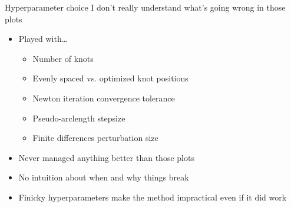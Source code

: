 \documentclass[presentation]{beamer}
\begin{document}
\begin{frame}[<+->][label={sec:orgb1058d1}]{Hyperparameter choice}
I don't really understand what's going wrong in those plots
\vfill
\begin{itemize}
\item Played with\ldots{}
\begin{itemize}
\item Number of knots
\item Evenly spaced vs. optimized knot positions
\item Newton iteration convergence tolerance
\item Pseudo-arclength stepsize
\item Finite differences perturbation size
\end{itemize}
\end{itemize}
\vfill
\begin{itemize}
\item Never managed anything better than those plots
\end{itemize}
\vfill
\begin{itemize}
\item No intuition about when and why things break
\end{itemize}
\vfill
\begin{itemize}
\item Finicky hyperparameters make the method impractical even if it did work
\end{itemize}
\end{frame}
\end{document}
